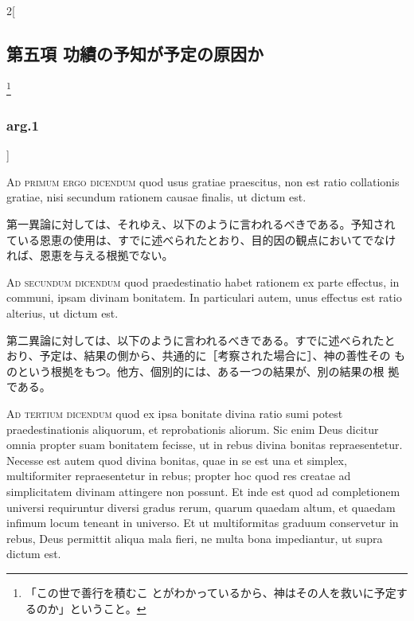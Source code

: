 \documentclass[paper=a4paper,fontsize=10pt,jafontsize=9pt,titlepage]{jlreq}
\begin{document}
\begin{paracol}{2}[\subsection{第五項 功績の予知が予定の原因か}\footnote{「この世で善行を積むこ とがわかっているから、神はその人を救いに予定するのか」ということ。}\subsubsection{arg.1}]
\switchcolumn*[\subsubsection{ad.1}]


{\scshape Ad primum ergo dicendum} quod usus gratiae
praescitus, non est ratio collationis gratiae, nisi secundum rationem
causae finalis, ut dictum est.


\switchcolumn


第一異論に対しては、それゆえ、以下のように言われるべきである。予知され
ている恩恵の使用は、すでに述べられたとおり、目的因の観点においてでなけ
れば、恩恵を与える根拠でない。


\switchcolumn*[\subsubsection{ad.2}]


{\scshape Ad secundum dicendum} quod praedestinatio
habet rationem ex parte effectus, in communi, ipsam divinam
bonitatem. In particulari autem, unus effectus est ratio alterius, ut
dictum est.


\switchcolumn


第二異論に対しては、以下のように言われるべきである。すでに述べられたと
おり、予定は、結果の側から、共通的に［考察された場合に］、神の善性その
ものという根拠をもつ。他方、個別的には、ある一つの結果が、別の結果の根
拠である。


\switchcolumn*[\subsubsection{ad.3}]


{\scshape Ad tertium dicendum} quod ex ipsa bonitate
divina ratio sumi potest praedestinationis aliquorum, et reprobationis
aliorum. Sic enim Deus dicitur omnia propter suam bonitatem fecisse, ut
in rebus divina bonitas repraesentetur. Necesse est autem quod divina
bonitas, quae in se est una et simplex, multiformiter repraesentetur in
rebus; propter hoc quod res creatae ad simplicitatem divinam attingere
non possunt. Et inde est quod ad completionem universi requiruntur
diversi gradus rerum, quarum quaedam altum, et quaedam infimum locum
teneant in universo. Et ut multiformitas graduum conservetur in rebus,
Deus permittit aliqua mala fieri, ne multa bona impediantur, ut supra
dictum est.


\switchcolumn



\end{paracol}
\end{document}
